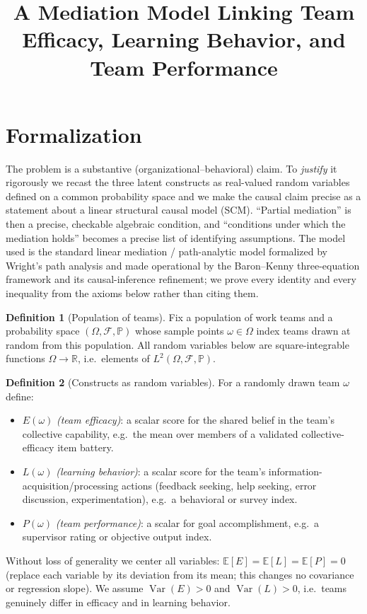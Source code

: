 \documentclass{amsart}
\theoremstyle{definition}
\newtheorem{definition}{Definition}
\begin{document}
\title{A Mediation Model Linking Team Efficacy, Learning Behavior, and Team Performance}
\maketitle

\section{Formalization}

The problem is a substantive (organizational--behavioral) claim. To
\emph{justify} it rigorously we recast the three latent constructs as
real-valued random variables defined on a common probability space and we make
the causal claim precise as a statement about a linear structural causal model
(SCM). ``Partial mediation'' is then a precise, checkable algebraic condition,
and ``conditions under which the mediation holds'' becomes a precise list of
identifying assumptions. The model used is the standard linear mediation /
path-analytic model formalized by Wright's path analysis and made operational
by the Baron--Kenny three-equation framework and its causal-inference
refinement; we prove every identity and every inequality from the axioms below
rather than citing them.

\begin{definition}[Population of teams]
Fix a population of work teams and a probability space
$(\Omega,\mathcal F,\mathbb P)$ whose sample points $\omega\in\Omega$ index
teams drawn at random from this population. All random variables below are
square-integrable functions $\Omega\to\mathbb R$, i.e.\ elements of
$L^2(\Omega,\mathcal F,\mathbb P)$.
\end{definition}

\begin{definition}[Constructs as random variables]\label{def:constructs}
For a randomly drawn team $\omega$ define:
\begin{itemize}
\item $E(\omega)$ \emph{(team efficacy)}: a scalar score for the shared belief
in the team's collective capability, e.g.\ the mean over members of a validated
collective-efficacy item battery.
\item $L(\omega)$ \emph{(learning behavior)}: a scalar score for the team's
information-acquisition/processing actions (feedback seeking, help seeking,
error discussion, experimentation), e.g.\ a behavioral or survey index.
\item $P(\omega)$ \emph{(team performance)}: a scalar for goal accomplishment,
e.g.\ a supervisor rating or objective output index.
\end{itemize}
Without loss of generality we center all variables:
$\mathbb E[E]=\mathbb E[L]=\mathbb E[P]=0$ (replace each variable by its
deviation from its mean; this changes no covariance or regression slope). We
assume $\operatorname{Var}(E)>0$ and $\operatorname{Var}(L)>0$, i.e.\ teams
genuinely differ in efficacy and in learning behavior.
\end{definition}
\end{document}
